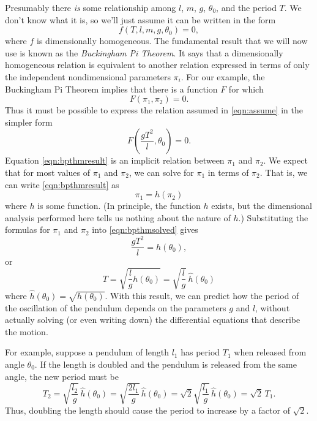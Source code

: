 \documentclass[reqno]{immbook}
\numberwithin{equation}{chapter}
\numberwithin{question}{section}
\numberwithin{theorem}{chapter}
\numberwithin{figure}{chapter}
\theoremstyle{definition}
\begin{document}
Presumably there \emph{is} some relationship
among $l$, $m$, $g$, $\theta_0$, and the
period $T$. We don't know what it is, so we'll
just assume it can be written in the form
\begin{equation}
   f(T,l,m,g,\theta_0) = 0,
   \label{eqn:assume}
\end{equation}
where $f$ is dimensionally homogeneous.
The fundamental result that we will now use
is known as the \emph{Buckingham Pi Theorem}.
It says that a dimensionally homogeneous
relation is equivalent to another relation
expressed  in terms of only the independent
nondimensional parameters $\pi_i$.
For our example, the Buckingham Pi Theorem
implies that there is a function $F$
for which
\begin{equation}
   F(\pi_1,\pi_2) = 0.
   \label{eqn:bpthmresult}
\end{equation}
Thus it must be possible to
express the relation assumed in
\eqref{eqn:assume} in the simpler form
\begin{equation}
    F\left(\frac{gT^2}{l},\theta_0\right) = 0.
\end{equation}
Equation \eqref{eqn:bpthmresult}
is an implicit relation between $\pi_1$ and $\pi_2$.
We expect that for most values of $\pi_1$ and
$\pi_2$, we can solve for $\pi_1$ in terms
of $\pi_2$.  That is, we can write
\eqref{eqn:bpthmresult} as
\begin{equation}
    \pi_1 = h(\pi_2)
    \label{eqn:bpthmsolved}
\end{equation}
where $h$ is some function.
(In principle, the function $h$ exists,
but the dimensional analysis performed here
tells us nothing about the nature of $h$.)
Substituting the formulas for $\pi_1$ and $\pi_2$
into \eqref{eqn:bpthmsolved} gives
\begin{equation}
    \frac{gT^2}{l} = h(\theta_0),
\end{equation}
or
\begin{equation}
    T = \sqrt{\frac{l}{g} h(\theta_0)}
      = \sqrt{\frac{l}{g}}\, \hat{h}(\theta_0)
\end{equation}
where $\hat{h}(\theta_0) = \sqrt{h(\theta_0)}$.
With this result, we can predict how the period
of the oscillation of the pendulum depends on
the parameters $g$ and $l$, without actually
solving (or even writing down) the differential
equations that describe the motion.

For example, suppose a pendulum of length $l_1$ has
period $T_1$ when released from angle $\theta_0$.
If the length is doubled and the pendulum
is released from the same angle, the new period
must be
\begin{equation}
   T_2 = \sqrt{\frac{l_2}{g}} \, \hat{h}(\theta_0)
       = \sqrt{\frac{2l_1}{g}} \, \hat{h}(\theta_0)
       = \sqrt{2}\sqrt{\frac{l_1}{g}} \, \hat{h}(\theta_0)
       = \sqrt{2} \, T_1.
\end{equation}
Thus, doubling the length should cause the period
to increase by a factor of $\sqrt{2}$.
\end{document}
